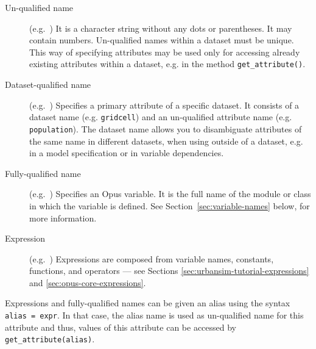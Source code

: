 \begin{description}
\item[Un-qualified name] (e.g.\ ) It is a character string
  without any dots or parentheses. It may contain numbers. Un-qualified
  names within a dataset \datasetindex must be unique. This way of
  specifying attributes \attributesindex may be used only for accessing
  already existing attributes \attributesindex within a dataset,
  \datasetindex e.g.  in the method
  \verb|get_attribute()|. \attributesindex

\item[Dataset-qualified name] (e.g.\ ) Specifies
  a primary attribute \attributesindex of a specific dataset. \datasetindex
  It consists of a dataset \datasetindex name (e.g.  \verb|gridcell|) and
  an un-qualified attribute \attributesindex name (e.g.
  \verb|population|).  The dataset \datasetindex name allows you to
  disambiguate attributes \attributesindex of the same name in different
  datasets, \datasetindex when using outside of a dataset, \datasetindex
  e.g. in a model specification or in variable \variablesindex
  dependencies.

\item[Fully-qualified name] (e.g.\ )
  Specifies an Opus variable. \variablesindex It is the full name of the
  module or class in which the variable \variablesindex is defined. See
  Section~\ref{sec:variable-names} below, for more information.

\item[Expression] (e.g.\ )
  Expressions are composed from variable names, constants, functions, and
  operators --- see Sections \ref{sec:urbansim-tutorial-expressions} and
  \ref{sec:opus-core-expressions}.

\end{description}
Expressions and fully-qualified names can be given an alias using the syntax
\verb|alias = expr|.  In that case, the alias name is used as un-qualified
name for this attribute and thus, values of this attribute can be accessed
by \verb|get_attribute(alias)|.

%
